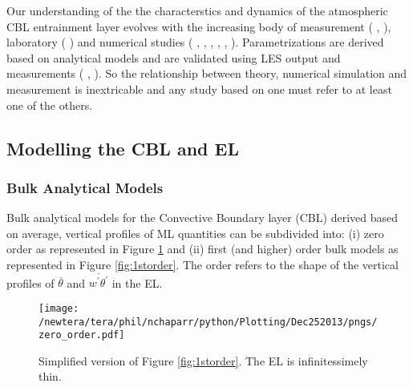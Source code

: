 Our understanding of the the characterstics and dynamics of the atmospheric \acs{CBL} entrainment layer evolves with the increasing body of measurement (\citeauthor{Traum11} \citeyear{Traum11}, \citeauthor{StullNelEl} \citeyear{StullNelEl}), laboratory (\citeauthor{DearWill80} \citeyear{DearWill80}) and numerical studies (\citeauthor{Deardorff72} \citeyear{Deardorff72}, \citeauthor{Sorbjan} \citeyear{Sorbjan}, \citeauthor{SullMoengStev} \citeyear{SullMoengStev}, \citeauthor{FedConzMir04} \citeyear{FedConzMir04}, \citeauthor{BrooksFowler2} \citeyear{BrooksFowler2}, \citeauthor{GarciaMellado} \citeyear{GarciaMellado}). Parametrizations are derived based on analytical models and are validated using \acs{LES} output and measurements (\citeauthor{FedConzMir04} \citeyear{FedConzMir04}, \citeauthor{Boers89} \citeyear{Boers89}).  So the relationship between theory, numerical simulation and measurement is inextricable and any study based on one must refer to at least one of the others.\\  

\subsection{Modelling the CBL and EL}
\label{subsec:}

\subsubsection{Bulk Analytical Models}
\label{subsubsec:}
Bulk analytical models for the Convective Boundary layer (\acs{CBL}) derived based on average, vertical profiles of \acs{ML} quantities can be subdivided into: (i) zero order as represented in Figure \ref{fig:0order} and (ii) first (and higher) order bulk models as represented in Figure \ref{fig:1storder}. The order refers to the shape of the vertical profiles of $\overline{\theta}$ and $\overline{w^{'}\theta^{'}}$ in the \acs{EL}.\\

\begin{figure}[htbp]
    \centering
    \texttt{[image: /newtera/tera/phil/nchaparr/python/Plotting/Dec252013/pngs/zero\_order.pdf]}
    \caption{Simplified version of Figure \ref{fig:1storder}.  The \acs{EL} is infinitessimely thin.}
    \label{fig:0order}   %
\end{figure}

